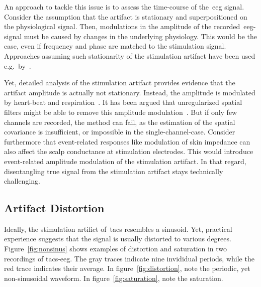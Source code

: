 \documentclass[a4paper]{article}
\begin{document}
An approach to tackle this issue is to assess the time-course of the~\gls{eeg} signal. Consider the assumption that the artifact is stationary and superpositioned on the physiological signal. Then, modulations in the amplitude of the recorded~\gls{eeg}-signal must be caused by changes in the underlying physiology.
This would be the case, even if frequency and phase are matched to the stimulation signal. Approaches assuming such stationarity of the stimulation artifact have been used e.g.\ by~\cite{Pogosyan_2009}.

Yet, detailed analysis of the stimulation artifact provides evidence that the artifact amplitude is actually not stationary. Instead, the amplitude is modulated by heart-beat and respiration~\citep{Noury_2016}. It has been argued that unregularized spatial filters might be able to remove this amplitude modulation~\citep{Neuling_2017}. But if only few channels are recorded, the method can fail, as the estimation of the spatial covariance is insufficient, or impossible in the single-channel-case.
Consider furthermore that event-related responses like modulation of skin impedance can also affect the scalp conductance at stimulation electrodes. This would introduce event-related amplitude modulation of the stimulation artifact. In that regard, disentangling true signal from the stimulation artifact stays technically challenging.

\subsection{Artifact Distortion}

Ideally, the stimulation artifict of~\gls{tacs} resembles a sinusoid. Yet, practical experience suggests that the signal is usually distorted to various degrees.
Figure~\ref{fig:nonsinus} shows examples of distortion and saturation in two recordings of \gls{tacs}-\gls{eeg}. The gray traces indicate nine invididual periods, while the red trace indicates their average. In figure~\ref{fig:distortion}, note the periodic, yet non-sinusoidal waveform. In figure~\ref{fig:saturation}, note the saturation.
\end{document}
